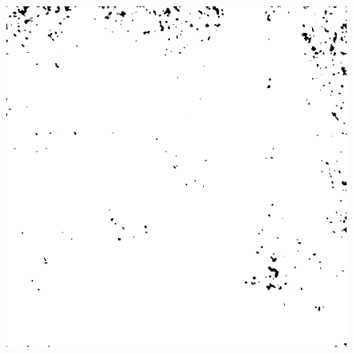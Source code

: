 \begin{figure}[H]
\begin{minipage}[t]{0.3\linewidth}
	\label{fig:hus_m20}
\end{minipage}
\begin{minipage}[t]{0.3\linewidth} %
	\includegraphics[width = 1\linewidth]{gfx/sit/sit_m20.png}
	\label{fig:sit_m20}
\end{minipage}
\end{figure}
